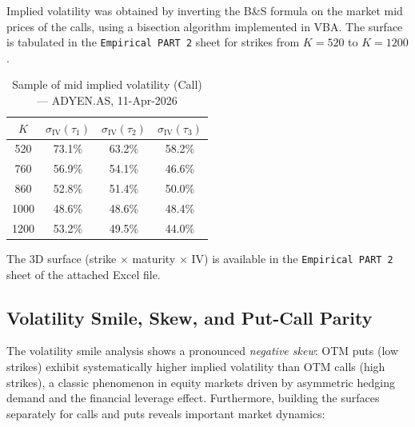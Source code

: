 \documentclass{report}
\begin{document}
Implied volatility was obtained by inverting the B\&S formula on the market mid prices
of the calls, using a bisection algorithm implemented in VBA.
The surface is tabulated in the \texttt{Empirical PART 2} sheet for strikes from
$K = 520$ to $K = 1200$.
 
\begin{table}[H]
\centering
\caption{Sample of mid implied volatility (Call) — ADYEN.AS, 11-Apr-2026}
\begin{tabular}{cccc}
\toprule
$K$ & $\sigma_{\mathrm{IV}}(\tau_1)$ & $\sigma_{\mathrm{IV}}(\tau_2)$ &
$\sigma_{\mathrm{IV}}(\tau_3)$ \\
\midrule
520  & 73.1\%  & 63.2\%  & 58.2\% \\
760  & 56.9\%  & 54.1\%  & 46.6\% \\
860  & 52.8\%  & 51.4\%  & 50.0\% \\
1000 & 48.6\%  & 48.6\%  & 48.4\% \\
1200 & 53.2\%  & 49.5\%  & 44.0\% \\
\bottomrule
\end{tabular}
\end{table}
 
The 3D surface (strike $\times$ maturity $\times$ IV) is available in the
\texttt{Empirical PART 2} sheet of the attached Excel file.
 
\subsection{Volatility Smile, Skew, and Put-Call Parity}

The volatility smile analysis shows a pronounced \emph{negative skew}: OTM puts (low strikes) exhibit systematically higher implied volatility than OTM calls (high strikes), a classic phenomenon in equity markets driven by asymmetric hedging demand and the financial leverage effect. Furthermore, building the surfaces separately for calls and puts reveals important market dynamics:
\end{document}
